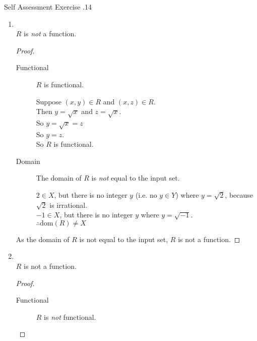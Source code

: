 \documentclass[../notes.tex]{subfiles}
\begin{document}
\begin{exercise}{Self Assessment Exercise \thechapter.14}
\begin{enumerate}
\begin{enumerate}[label=(\alph*)]
\begin{proof}
\begin{description}
										\end{description}
										As $R$ is functional, and the domain of $R$ is equal to the input set, $R$ is a function.
									\end{proof}
								\pagebreak
								\item {}\\
									$R$ is \emph{not} a function.
									\begin{proof}
										$ $
										\begin{description}
											\item[Functional] $R$ is functional.
												\begin{subproof}[Subproof]
													Suppose $(x, y) \in R$ and $(x, z) \in R$.\\
													Then $y = \sqrt{x}$ and $z = \sqrt{x}$.\\
													So $y = \sqrt{x} = z$\\
													So $y = z$.\\
													So $R$ is functional.
												\end{subproof}
											\item[Domain] The domain of $R$ is \emph{not} equal to the input set.
												\begin{subproof}[Counterexample]
													$2 \in X$, but there is no integer $y$ (i.e. no $y \in Y$) where $y = \sqrt{2}$, because $\sqrt{2}$ is irrational.\\
													$-1 \in X$, but there is no integer $y$ where $y = \sqrt{-1}$.\\
													$\therefore \mathrm{dom}(R) \neq X$ 
												\end{subproof}
										\end{description}
										As the domain of $R$ is not equal to the input set, $R$ is not a function.
									\end{proof}
								\item {}\\
									$R$ is not a function.
									\begin{proof}
										$ $
										\begin{description}
											\item[Functional] $R$ is \emph{not} functional.
												\begin{subproof}[Subproof]

\end{subproof}
\end{description}
\end{proof}
\end{enumerate}
\end{enumerate}
\end{exercise}
\end{document}
